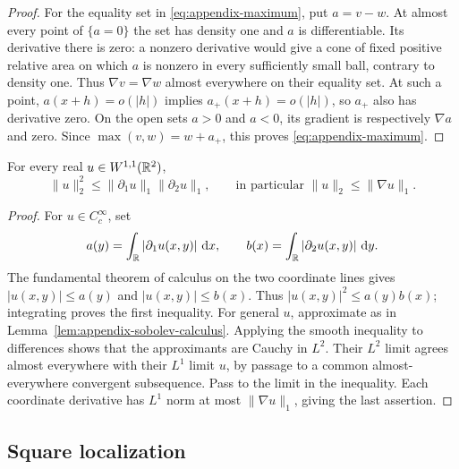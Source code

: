 \begin{proof}
For the equality set in \eqref{eq:appendix-maximum}, put $a=v-w$.
At almost every point of $\{a=0\}$ the set has density one and
$a$ is differentiable. Its derivative there is zero: a nonzero
derivative would give a cone of fixed positive relative area on
which $a$ is nonzero in every sufficiently small ball, contrary
to density one. Thus $\nabla v=\nabla w$ almost everywhere on
their equality set. At such a point,
$a(x+h)=o(|h|)$ implies $a_+(x+h)=o(|h|)$, so $a_+$ also has
derivative zero. On the open sets $a>0$ and $a<0$, its gradient
is respectively $\nabla a$ and zero. Since
$\max(v,w)=w+a_+$, this proves \eqref{eq:appendix-maximum}.
\end{proof}

\begin{lemma}\label{lem:appendix-planar-embedding}
For every real $u\in W^{1,1}(\mathbb R^2)$,
\[
 \|u\|_2^2\le\|\partial_1u\|_1\|\partial_2u\|_1,
 \qquad\text{in particular }\|u\|_2\le\|\nabla u\|_1.
\]
\end{lemma}

\begin{proof}
For $u\in C_c^\infty$, set
\[
 a(y)=\int_\mathbb R|\partial_1u(x,y)|\,\mathop{}\!\mathrm{d} x,
 \qquad b(x)=\int_\mathbb R|\partial_2u(x,y)|\,\mathop{}\!\mathrm{d} y.
\]
The fundamental theorem of calculus on the two coordinate lines
gives $|u(x,y)|\le a(y)$ and $|u(x,y)|\le b(x)$.
Thus $|u(x,y)|^2\le a(y)b(x)$; integrating proves the first
inequality. For general $u$, approximate as in
Lemma~\ref{lem:appendix-sobolev-calculus}. Applying the smooth
inequality to differences shows that the approximants are Cauchy
in $L^2$. Their $L^2$ limit agrees almost everywhere with their
$L^1$ limit $u$, by passage to a common almost-everywhere
convergent subsequence. Pass to the limit in the inequality.
Each coordinate derivative has $L^1$ norm at most
$\|\nabla u\|_1$, giving the last assertion.
\end{proof}

\subsection{Square localization}

